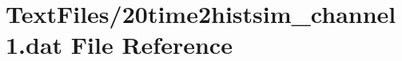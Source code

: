 \hypertarget{20time2histsim__channel1_8dat}{}\section{Text\+Files/20time2histsim\+\_\+channel1.dat File Reference}
\label{20time2histsim__channel1_8dat}
